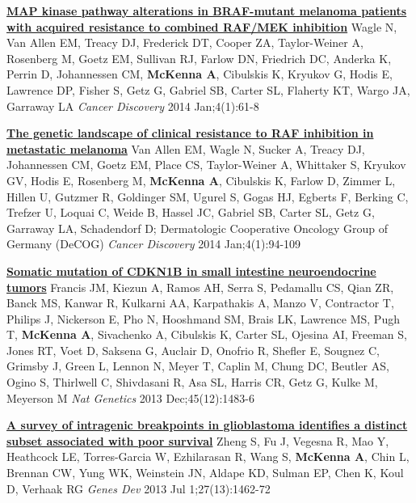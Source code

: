 \documentclass[9pt]{article}
\begin{document}
\noindent\href{https://www.ncbi.nlm.nih.gov/pubmed/24265154}{\bf  MAP kinase  pathway alterations in BRAF-mutant melanoma patients with acquired resistance to  combined RAF/MEK inhibition}\vspace{-0.03in}
\newline\noindent Wagle N, Van Allen EM, Treacy DJ, Frederick DT, Cooper ZA, Taylor-Weiner A, Rosenberg M, Goetz EM, Sullivan RJ, Farlow DN, Friedrich DC, Anderka K, Perrin D, Johannessen CM, \textbf{McKenna A}, Cibulskis K, Kryukov G, Hodis E, Lawrence DP, Fisher S, Getz G, Gabriel SB, Carter SL, Flaherty KT, Wargo JA, Garraway LA
\newline\noindent\emph{ Cancer Discovery} 2014 Jan;4(1):61-8
\bigskip

\noindent\href{https://www.ncbi.nlm.nih.gov/pubmed/24265153}{\bf  The genetic landscape of clinical resistance to RAF inhibition in metastatic melanoma}\vspace{-0.03in}
\newline\noindent Van Allen EM, Wagle N, Sucker A, Treacy DJ, Johannessen CM, Goetz EM, Place CS, Taylor-Weiner A, Whittaker S, Kryukov GV, Hodis E, Rosenberg M, \textbf{McKenna A}, Cibulskis K, Farlow D, Zimmer L, Hillen U, Gutzmer R, Goldinger SM, Ugurel S, Gogas HJ, Egberts F, Berking C, Trefzer U, Loquai C, Weide B, Hassel JC, Gabriel  SB, Carter SL, Getz G, Garraway LA, Schadendorf D; Dermatologic Cooperative Oncology Group of Germany (DeCOG)
\newline\noindent\emph{ Cancer Discovery} 2014 Jan;4(1):94-109
\bigskip

\noindent\href{https://www.ncbi.nlm.nih.gov/pubmed/24185511}{\bf  Somatic mutation of CDKN1B in small intestine neuroendocrine tumors}\vspace{-0.03in}
\newline\noindent Francis JM, Kiezun A, Ramos AH, Serra S, Pedamallu CS, Qian ZR, Banck MS, Kanwar R, Kulkarni AA, Karpathakis A, Manzo V, Contractor T, Philips J, Nickerson E, Pho N, Hooshmand SM, Brais LK, Lawrence MS, Pugh T, \textbf{McKenna A}, Sivachenko A, Cibulskis K, Carter SL, Ojesina AI, Freeman S, Jones RT, Voet D, Saksena G, Auclair D, Onofrio R, Shefler E, Sougnez C, Grimsby J, Green L, Lennon N, Meyer T, Caplin M, Chung DC, Beutler AS, Ogino S, Thirlwell C, Shivdasani R, Asa SL, Harris CR, Getz G, Kulke M, Meyerson M
\newline\noindent\emph{ Nat Genetics} 2013 Dec;45(12):1483-6
\bigskip

\noindent\href{https://www.ncbi.nlm.nih.gov/pubmed/23796897}{\bf  A survey of intragenic breakpoints in glioblastoma identifies a distinct subset associated with poor survival}\vspace{-0.03in}
\newline\noindent Zheng S, Fu J, Vegesna R, Mao Y, Heathcock LE, Torres-Garcia W, Ezhilarasan R, Wang S, \textbf{McKenna A}, Chin L, Brennan CW, Yung WK, Weinstein JN, Aldape KD, Sulman EP, Chen K, Koul D, Verhaak RG
\newline\noindent\emph{ Genes Dev} 2013 Jul 1;27(13):1462-72
\bigskip
\end{document}
